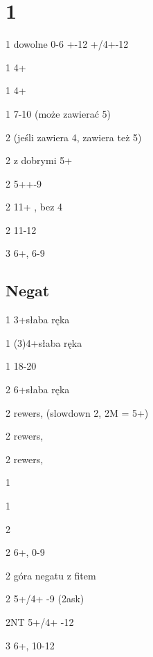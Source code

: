 \documentclass[12pt, a4paper]{article}
\begin{document}
\section*{1\clubs}
\sequence{{1\clubs}}
\begin{options}[2]
    \item[1\diams] dowolne 0-6 +-12 +/4+-12
    \item[1\hearts] 4+ \fonce
    \item[1\spades] 4+ \fonce  
    \item[1\nt] 7-10 \bal (może zawierać 5\diams) 
    \item[2\clubs] \gf (jeśli zawiera 4\major, zawiera też 5\clubs)
    \item[2\diams] \gf z dobrymi 5+\diams
    \item[2\hearts] 5++-9
    \item[2\spades] 11+ \bal, bez 4\major
    \item[2\nt] 11-12 \bal
    \item[3\clubs] 6+\clubs, 6-9   
\end{options}

\subsection*{Negat}

\sequence{{1\clubs}{1\diams}}
\begin{options}[1]
    \item[1\hearts] 3+\hearts słaba ręka
    \item[1\spades] (3)4+\spades słaba ręka
    \item[1\nt] 18-20 \bal
    \item[2\clubs] 6+\clubs słaba ręka
    \item[2\diams] rewers, \fonce (slowdown 2\nt \nf, 2M = 5+)
    \item[2\hearts] rewers, \fonce
    \item[2\spades] rewers, \fonce
\end{options}

\sequence{{1\clubs}{1\diams}{1\major}}
\begin{options}[2]
    \item[1\spades] \nf
    \item[1\nt] \nf
    \item[2\clubs] \nf
    \item[2\diams] 6+\diams, 0-9
    \item[2\major] góra negatu z fitem
    \item[2\twosuit{\spades}{\hearts}] 5+/4+ -9 (2\nt ask)
    \item[2NT] 5+/4+ -12 \imp
    \item[3\diams] 6+\diams, 10-12 
\end{options}
\end{document}
